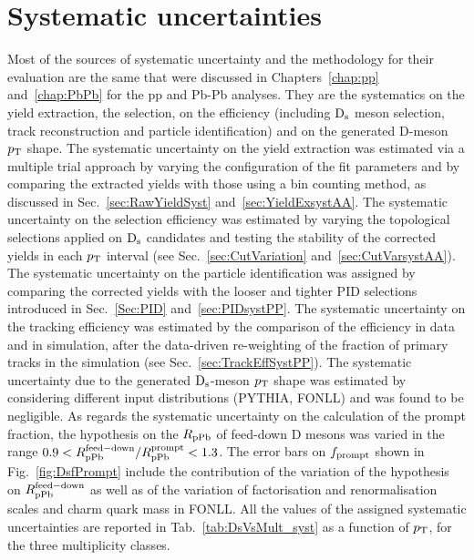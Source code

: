 \section {Systematic uncertainties}
\label{sec:systpA}
Most of the sources of systematic uncertainty and the methodology for their evaluation are the same
that were discussed in Chapters~\ref{chap:pp} and~\ref{chap:PbPb} for
the pp and Pb-Pb analyses. They are the systematics on the yield extraction, 
the selection, on the efficiency (including ${\rm D_s}$ meson selection, track reconstruction and particle
identification) and on the generated D-meson $p_{\rm T}$ shape.
The systematic uncertainty on the yield extraction was estimated via a multiple
trial approach by varying the configuration of the fit parameters and by comparing the
extracted yields with those using a bin counting method, as discussed in Sec.~\ref{sec:RawYieldSyst} and~\ref{sec:YieldExsystAA}. 
The systematic uncertainty on the selection efficiency was estimated by 
varying the topological selections applied on ${\rm D_s}$ candidates and testing the 
stability of the corrected yields in each $p_{\rm T}$ interval (see Sec.~\ref{sec:CutVariation} and~\ref{sec:CutVarsystAA}). 
The systematic uncertainty on the particle
identification was assigned by comparing the corrected yields with the looser and tighter
PID selections introduced in Sec.~\ref{Sec:PID} and~\ref{sec:PIDsystPP}. 
The systematic uncertainty on the tracking efficiency was estimated by the comparison of the
efficiency in data and in simulation, after the data-driven re-weighting of the fraction of primary tracks in 
the simulation (see Sec.~\ref{sec:TrackEffSystPP}). 
The systematic uncertainty due to the generated ${\rm D_s}$-meson $p_{\rm T}$ shape was estimated by considering different input
distributions (PYTHIA, FONLL) and was found to be negligible. As regards the systematic uncertainty on the calculation of the prompt 
fraction, the hypothesis on the $R_{\rm pPb}$ of feed-down D mesons 
was varied in the range $0.9 <R_{\rm pPb}^{\rm feed-down}/R_{\rm pPb}^{\rm prompt} < 1.3$.
The error bars on $f_{\rm prompt}$ shown in Fig.~\ref{fig:DsfPrompt} include the
contribution of the variation of the hypothesis on $R_{\rm pPb}^{\rm feed-down}$ 
as well as of the variation of factorisation and renormalisation scales and charm quark mass in FONLL. 
All the values of the assigned systematic uncertainties are reported
in Tab.~\ref{tab:DsVsMult_syst} as a function of $p_{\rm T}$, for the 
three multiplicity classes. \\


